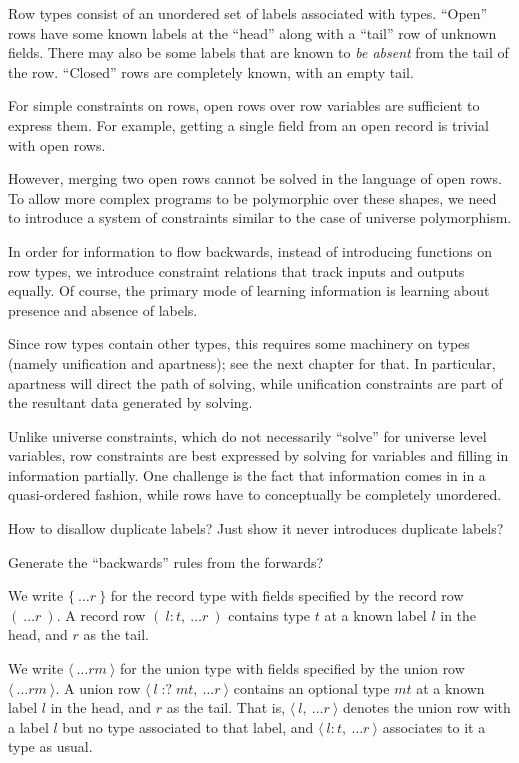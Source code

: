 \documentclass[11pt, twoside, reqno]{book}
\providecommand{\lcurvyangle}{\langle}
\providecommand{\rcurvyangle}{\rangle}
\begin{document}
Row types consist of an unordered set of labels associated with types.
``Open'' rows have some known labels at the ``head'' along with a ``tail'' row of unknown fields.
There may also be some labels that are known to \emph{be absent} from the tail of the row.
``Closed'' rows are completely known, with an empty tail.

For simple constraints on rows, open rows over row variables are sufficient to express them.
For example, getting a single field from an open record is trivial with open rows.

However, merging two open rows cannot be solved in the language of open rows.
To allow more complex programs to be polymorphic over these shapes, we need to introduce a system of constraints similar to the case of universe polymorphism.

In order for information to flow backwards, instead of introducing functions on row types, we introduce constraint relations that track inputs and outputs equally.
Of course, the primary mode of learning information is learning about presence and absence of labels.

Since row types contain other types, this requires some machinery on types (namely unification and apartness); see the next chapter for that.
In particular, apartness will direct the path of solving, while unification constraints are part of the resultant data generated by solving.

Unlike universe constraints, which do not necessarily “solve” for universe level variables, row constraints are best expressed by solving for variables and filling in information partially.
One challenge is the fact that information comes in in a quasi-ordered fashion, while rows have to conceptually be completely unordered.

\begin{mdframed}[style=TODO]
How to disallow duplicate labels?
Just show it never introduces duplicate labels?
\end{mdframed}

\begin{mdframed}[style=TODO]
Generate the ``backwards'' rules from the forwards?
\end{mdframed}

We write \(\{\ \dots\!r\ \}\) for the record type with fields specified by the record row \((\ \dots\!r\ )\).
A record row \((\ l : t,\ \dots\!r\ )\) contains type \(t\) at a known label \(l\) in the head, and \(r\) as the tail.

We write \(\langle\ \dots\!\mathit{rm}\ \rangle\) for the union type with fields specified by the union row \(\lcurvyangle\ \dots\!\mathit{rm}\ \rcurvyangle\).
A union row \(\lcurvyangle\ l \mathop{{:}{?}} \mathit{mt},\ \dots\!r\ \rcurvyangle\) contains an optional type \(\mathit{mt}\) at a known label \(l\) in the head, and \(r\) as the tail.
That is, \(\lcurvyangle\ l,\ \dots\!r\ \rcurvyangle\) denotes the union row with a label \(l\) but no type associated to that label, and \(\lcurvyangle\ l : t,\ \dots\!r\ \rcurvyangle\) associates to it a type as usual.
\end{document}
